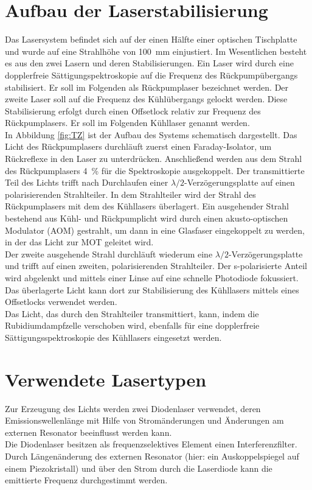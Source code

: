\documentclass[
class=book,
accentcolor=1b,
custommargins=geometry,
fontsize=11pt,
thesis={type=Versuchsanleitung},
ruledheaders=all,
headline=false,
instbox=false,
marginpar=false,
title=small,
ignore-missing-data=true,
twoside=false,
logofile=apqdesign/tuda_logo.pdf,
pdfa=false %
]{apqpub}
\begin{document}
			\section{Aufbau der Laserstabilisierung}	
			Das Lasersystem befindet sich auf der einen Hälfte einer optischen Tischplatte und wurde auf eine Strahlhöhe von \qty{100}{\milli\metre} einjustiert. Im Wesentlichen besteht es aus den zwei Lasern und deren Stabilisierungen. Ein Laser wird durch eine dopplerfreie Sättigungspektroskopie auf die Frequenz des Rückpumpübergangs stabilisiert. Er soll im Folgenden als Rückpumplaser bezeichnet werden. Der zweite Laser soll auf die Frequenz des Kühlübergangs gelockt werden. Diese Stabilisierung erfolgt durch einen Offsetlock relativ zur Frequenz des Rückpumplasers. Er soll im Folgenden Kühllaser genannt werden.\\
			In Abbildung \ref{fig:TZ} ist der Aufbau des Systems schematisch dargestellt. Das Licht des Rückpumplasers durchläuft zuerst einen Faraday-Isolator, um Rückreflexe in den Laser zu unterdrücken. Anschließend werden aus dem Strahl des Rückpumplasers \qty{4}{\percent} für die Spektroskopie ausgekoppelt. Der transmittierte Teil des Lichts trifft nach Durchlaufen einer $\lambda/2$-Verzögerungsplatte auf einen polarisierenden Strahlteiler. In dem Strahlteiler wird der Strahl des Rückpumplasers mit dem des Kühllasers überlagert. Ein ausgehender Strahl bestehend aus Kühl- und Rückpumplicht wird durch einen akusto-optischen Modulator (AOM) gestrahlt, um dann in eine Glasfaser eingekoppelt zu werden, in der das Licht zur MOT geleitet wird.\\
			Der zweite ausgehende Strahl durchläuft wiederum eine $\lambda/2$-Verzögerungsplatte und trifft auf einen zweiten, polarisierenden Strahlteiler. Der s-polarisierte Anteil wird abgelenkt und mittels einer Linse auf eine schnelle Photodiode fokussiert. Das überlagerte Licht kann dort zur Stabilisierung des Kühllasers mittels eines Offsetlocks verwendet werden.\\
			Das Licht, das durch den Strahlteiler transmittiert, kann, indem die Rubidiumdampfzelle verschoben wird, ebenfalls für eine dopplerfreie Sättigungsspektroskopie des Kühllasers eingesetzt werden.\\
			
			\section{Verwendete Lasertypen}			
			Zur Erzeugung des Lichts werden zwei Diodenlaser verwendet, deren Emissionswellenlänge mit Hilfe von Stromänderungen und Änderungen am externen Resonator beeinflusst werden kann.\\
			Die Diodenlaser besitzen als frequenzselektives Element einen Interferenzfilter. 
			Durch Längenänderung des externen Resonator (hier: ein Auskoppelspiegel auf einem Piezokristall) und über den Strom durch die Laserdiode kann die emittierte Frequenz durchgestimmt werden.\\
			
\end{document}
